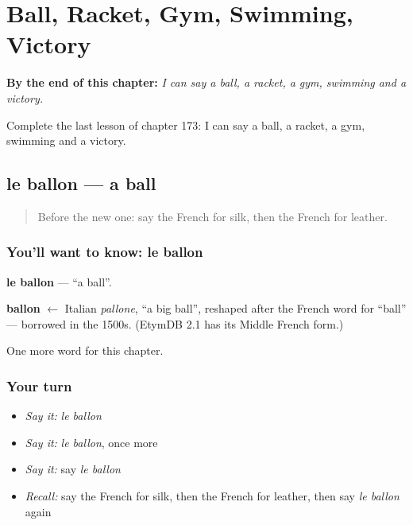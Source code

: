 
\chapter{Ball, Racket, Gym, Swimming, Victory}
\label{ch:fr-ball-racket-gym-swimming-victory}

\begin{chapteropening}
\textbf{By the end of this chapter:} \emph{I can say a ball, a racket, a gym, swimming and a victory.}

Complete the last lesson of chapter 173: I can say a ball, a racket, a gym, swimming and a victory.
\end{chapteropening}

\section[le ballon]{le ballon — a ball}

\label{lesson:FR-C173-ballon}



\begin{quote}
Before the new one: say the French for silk, then the French for leather.
\end{quote}

\subsection*{You'll want to know: le ballon}
\textbf{le ballon} — \textquotedblleft{}a ball\textquotedblright{}.

\begin{cousinweb}
\textbf{ballon} $\leftarrow$ Italian \emph{pallone}, \textquotedblleft{}a big ball\textquotedblright{}, reshaped after the French word for \textquotedblleft{}ball\textquotedblright{} — borrowed in the 1500s. (EtymDB 2.1 has its Middle French form.)
\end{cousinweb}

\begin{grammarlens}[title={What you've built}]
One more word for this chapter.
\end{grammarlens}

\subsection*{Your turn}
\begin{itemize}
\raggedright
  \item \emph{Say it:} \emph{le ballon}
  \item \emph{Say it:} \emph{le ballon}, once more
  \item \emph{Say it:} say \emph{le ballon}
  \item \emph{Recall:} say the French for silk, then the French for leather, then say \emph{le ballon} again
\end{itemize}

